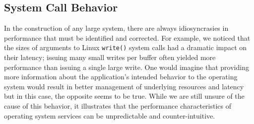 \subsection{System Call Behavior}

In the construction of any large system, there are always idiosyncrasies in
performance that must be identified and corrected.  For example, we noticed
that the sizes of arguments to Linux \texttt{write()} system calls had a
dramatic impact on their latency; issuing many small writes per buffer often
yielded more performance than issuing a single large write.  One would imagine
that providing more information about the application's intended behavior to
the operating system would result in better management of underlying resources
and latency but in this case, the opposite seems to be true.  While we are
still unsure of the cause of this behavior, it illustrates that the performance
characteristics of operating system services can be unpredictable and
counter-intuitive.

